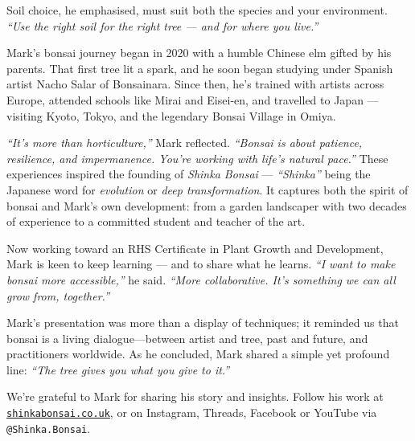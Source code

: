 Soil choice, he emphasised, must suit both the species and your environment. \textit{``Use the right soil for the right tree --- and for where you live.''}

\medskip
{}
\noindent
Mark's bonsai journey began in 2020 with a humble Chinese elm gifted by his parents. That first tree lit a spark, and he soon began studying under Spanish artist Nacho Salar of Bonsainara. Since then, he's trained with artists across Europe, attended schools like Mirai and Eisei-en, and travelled to Japan --- visiting Kyoto, Tokyo, and the legendary Bonsai Village in Omiya.

\textit{``It's more than horticulture,''} Mark reflected. \textit{``Bonsai is about patience, resilience, and impermanence. You're working with life's natural pace.''}
%
These experiences inspired the founding of \textit{Shinka Bonsai} --- \textit{``Shinka''} being the Japanese word for \textit{evolution} or \textit{deep transformation}. It captures both the spirit of bonsai and Mark's own development: from a garden landscaper with two decades of experience to a committed student and teacher of the art.

Now working toward an RHS Certificate in Plant Growth and Development, Mark is keen to keep learning --- and to share what he learns. \textit{``I want to make bonsai more accessible,''} he said. \textit{``More collaborative. It's something we can all grow from, together.''}

\medskip
{}
\noindent
Mark's presentation was more than a display of techniques; it reminded us that bonsai is a living dialogue---between artist and tree, past and future, and practitioners worldwide.
As he concluded, Mark shared a simple yet profound line: \textit{``The tree gives you what you give to it.''}

We're grateful to Mark for sharing his story and insights. Follow his work at \href{http://www.shinkabonsai.co.uk}{\texttt{shinkabonsai.co.uk}}, or on Instagram, Threads, Facebook or YouTube via \texttt{@Shinka.Bonsai}.

\closearticle
\columnbreak


